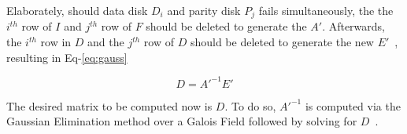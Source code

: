 Elaborately, should data disk $D_{i}$ and parity disk $P_{j}$ fails simultaneously, the the $i^{th}$ row of $I$ and $j^{th}$ row of $F$ should be deleted to generate the $A'$.
Afterwards, the $i^{th}$ row in $D$ and the $j^{th}$ row of $D$ should be deleted to generate the new $E'$~\cite{raid6_2011}, resulting in Eq-\ref{eq:gauss}

\begin{equation}
\label{eq:gauss}
D=A'^{-1}E'
\end{equation}

The desired matrix to be computed now is $D$.
To do so, $A'^{-1}$ is computed via the Gaussian Elimination method over a Galois Field followed by solving for $D$~\cite{matrix_1991}.






      
